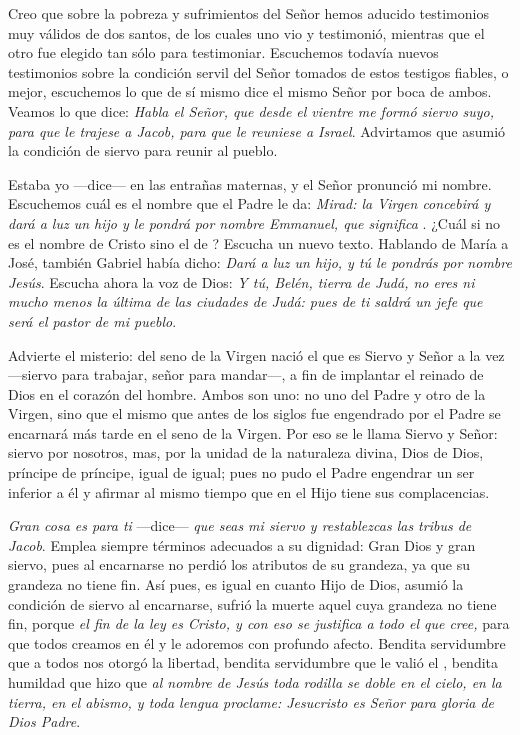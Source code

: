 				\begin{body}
					Creo que sobre la pobreza y sufrimientos del Señor hemos aducido testimonios muy válidos de dos santos, de los cuales uno vio y testimonió, mientras que el otro fue elegido tan sólo para testimoniar. Escuchemos todavía nuevos testimonios sobre la condición servil del Señor tomados de estos testigos fiables, o mejor, escuchemos lo que de sí mismo dice el mismo Señor por boca de ambos. Veamos lo que dice: \emph{Habla el Señor, que desde el vientre me formó siervo suyo, para que le trajese a Jacob, para que le reuniese a Israel}. Advirtamos que asumió la condición de siervo para reunir al pueblo.
					
					Estaba yo ---dice--- en las entrañas maternas, y el Señor pronunció mi nombre. Escuchemos cuál es el nombre que el Padre le da: \emph{Mirad: la Virgen concebirá y dará a luz un hijo y le pondrá por nombre Emmanuel, que significa }. ¿Cuál si no es el nombre de Cristo sino el de ? Escucha un nuevo texto. Hablando de María a José, también Gabriel había dicho: \emph{Dará a luz un hijo, y tú le pondrás por nombre Jesús}. Escucha ahora la voz de Dios: \emph{Y tú, Belén, tierra de Judá, no eres ni mucho menos la última de las ciudades de Judá: pues de ti saldrá un jefe que será el pastor de mi pueblo}.
					
					Advierte el misterio: del seno de la Virgen nació el que es Siervo y Señor a la vez ---siervo para trabajar, señor para mandar---, a fin de implantar el reinado de Dios en el corazón del hombre. Ambos son uno: no uno del Padre y otro de la Virgen, sino que el mismo que antes de los siglos fue engendrado por el Padre se encarnará más tarde en el seno de la Virgen. Por eso se le llama Siervo y Señor: siervo por nosotros, mas, por la unidad de la naturaleza divina, Dios de Dios, príncipe de príncipe, igual de igual; pues no pudo el Padre engendrar un ser inferior a él y afirmar al mismo tiempo que en el Hijo tiene sus complacencias.
					
					\emph{Gran cosa es para ti} ---dice--- \emph{que seas mi siervo y restablezcas las tribus de Jacob}. Emplea siempre términos adecuados a su dignidad: Gran Dios y gran siervo, pues al encarnarse no perdió los atributos de su grandeza, ya que su grandeza no tiene fin. Así pues, es igual en cuanto Hijo de Dios, asumió la condición de siervo al encarnarse, sufrió la muerte aquel cuya grandeza no tiene fin, porque \emph{el fin de la ley es Cristo, y con eso se justifica a todo el que cree,} para que todos creamos en él y le adoremos con profundo afecto. Bendita servidumbre que a todos nos otorgó la libertad, bendita servidumbre que le valió el , bendita humildad que hizo que \emph{al nombre de Jesús toda rodilla se doble en el cielo, en la tierra, en el abismo, y toda lengua proclame: Jesucristo es Señor para gloria de Dios Padre}.
				\end{body}
				
